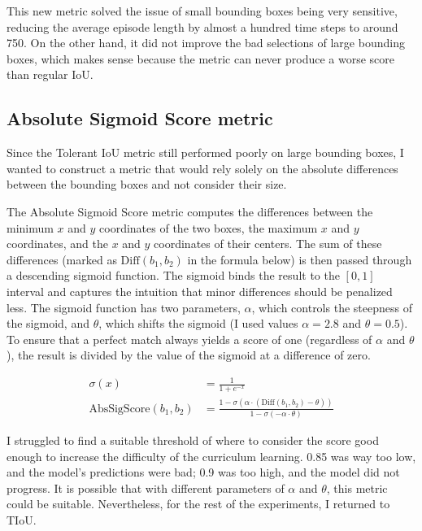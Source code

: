 \documentclass[
  digital,     %
  oneside,     %
  nosansbold,  %
  nocolorbold, %
  lof,         %
  lot,         %
]{fithesis4}
\begin{document}
This new metric solved the issue of small bounding boxes being very sensitive, reducing the average episode length by almost a hundred time steps to around 750. On the other hand, it did not improve the bad selections of large bounding boxes, which makes sense because the metric can never produce a worse score than regular IoU.

\subsection{Absolute Sigmoid Score metric}

Since the Tolerant IoU metric still performed poorly on large bounding boxes, I wanted to construct a metric that would rely solely on the absolute differences between the bounding boxes and not consider their size.

The Absolute Sigmoid Score metric computes the differences between the minimum $x$ and $y$ coordinates of the two boxes, the maximum $x$ and $y$ coordinates, and the $x$ and $y$ coordinates of their centers. The sum of these differences (marked as $\text{Diff}( b_1, b_2)$ in the formula below) is then passed through a descending sigmoid function. The sigmoid binds the result to the $[0,1]$ interval and captures the intuition that minor differences should be penalized less. The sigmoid function has two parameters, $\alpha$, which controls the steepness of the sigmoid, and $\theta$, which shifts the sigmoid (I used values $\alpha = 2.8$ and $\theta = 0.5$). To ensure that a perfect match always yields a score of one (regardless of $\alpha$ and $\theta$), the result is divided by the value of the sigmoid at a difference of zero.

\begin{equation}
\begin{split}
    \sigma(x) & = \frac{1}{1+e^{-x}} \\
    \text{AbsSigScore}( b_1, b_2) & = \frac{1-\sigma(\alpha\cdot(\text{Diff}( b_1, b_2)-\theta))}{1-\sigma(-\alpha\cdot\theta)}
\end{split}
\end{equation}

I struggled to find a suitable threshold of where to consider the score good enough to increase the difficulty of the curriculum learning. 0.85 was way too low, and the model's predictions were bad; 0.9 was too high, and the model did not progress. It is possible that with different parameters of $\alpha$ and $\theta$, this metric could be suitable. Nevertheless, for the rest of the experiments, I returned to TIoU.
\end{document}
